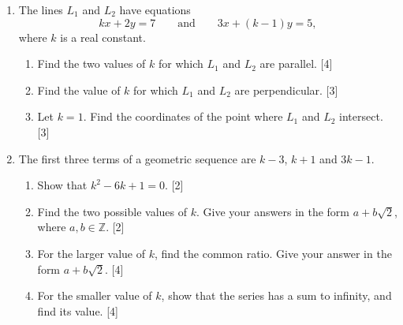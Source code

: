 \documentclass[12pt, twoside]{article}
\begin{document}
\begin{enumerate}[itemsep=0.15cm]

\item[1.] [Maximum mark: 10]

The lines $L_{1}$ and $L_{2}$ have equations
$$kx + 2y = 7 \qquad \text{and} \qquad 3x + (k - 1)y = 5,$$
where $k$ is a real constant.

\begin{enumerate}[itemsep=0.1cm]
  \item Find the two values of $k$ for which $L_{1}$ and $L_{2}$ are
  parallel. \hfill [4]
  \item Find the value of $k$ for which $L_{1}$ and $L_{2}$ are
  perpendicular. \hfill [3]
  \item Let $k = 1$. Find the coordinates of the point where $L_{1}$ and
  $L_{2}$ intersect. \hfill [3]
\end{enumerate}


\newpage

\item[2.] [Maximum mark: 12]

The first three terms of a geometric sequence are $k - 3$, $k + 1$ and
$3k - 1$.

\begin{enumerate}[itemsep=0.1cm]
  \item Show that $k^{2} - 6k + 1 = 0$. \hfill [2]
  \item Find the two possible values of $k$. Give your answers in the form
  $a + b\sqrt{2}$, where $a, b \in \mathbb{Z}$. \hfill [2]
  \item For the larger value of $k$, find the common ratio. Give your
  answer in the form $a + b\sqrt{2}$. \hfill [4]
  \item For the smaller value of $k$, show that the series has a sum to
  infinity, and find its value. \hfill [4]
\end{enumerate}


\end{enumerate}
\end{document}
